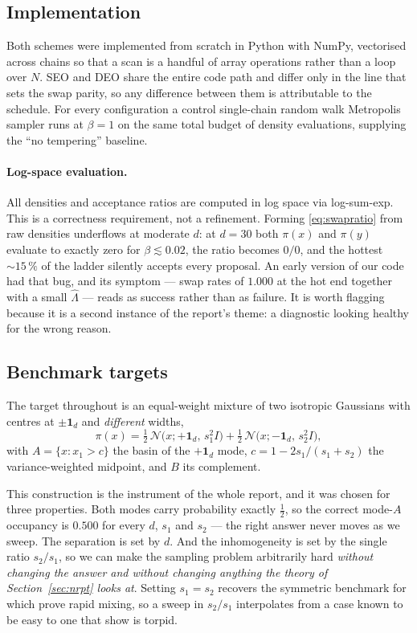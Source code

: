 \subsection{Implementation}

Both schemes were implemented from scratch in Python with NumPy, vectorised
across chains so that a scan is a handful of array operations rather than a loop
over $N$. SEO and DEO share the entire code path and differ only in the line that
sets the swap parity, so any difference between them is attributable to the
schedule. For every configuration a control single-chain random walk Metropolis
sampler runs at $\beta=1$ on the same total budget of density evaluations,
supplying the ``no tempering'' baseline.

\paragraph{Log-space evaluation.}
All densities and acceptance ratios are computed in log space via log-sum-exp.
This is a correctness requirement, not a refinement. Forming \eqref{eq:swapratio}
from raw densities underflows at moderate $d$: at $d=30$ both $\pi(x)$ and
$\pi(y)$ evaluate to exactly zero for $\beta\lesssim0.02$, the ratio becomes
$0/0$, and the hottest $\sim\!15\,\%$ of the ladder silently accepts every
proposal. An early version of our code had that bug, and its symptom --- swap
rates of $1.000$ at the hot end together with a small $\hat\Lambda$ --- reads as
success rather than as failure. It is worth flagging because it is a second
instance of the report's theme: a diagnostic looking healthy for the wrong
reason.

\subsection{Benchmark targets}
\label{sec:benchmark}

The target throughout is an equal-weight mixture of two isotropic Gaussians with
centres at $\pm\mathbf1_d$ and \emph{different} widths,
\begin{equation}
  \pi(x)=\tfrac12\,\mathcal N\!\big(x;+\mathbf1_d,\,s_1^2I\big)
        +\tfrac12\,\mathcal N\!\big(x;-\mathbf1_d,\,s_2^2I\big),
  \label{eq:target}
\end{equation}
with $A=\{x:x_1>c\}$ the basin of the $+\mathbf1_d$ mode, $c=1-2s_1/(s_1+s_2)$
the variance-weighted midpoint, and $B$ its complement.

This construction is the instrument of the whole report, and it was chosen for
three properties. Both modes carry probability exactly $\tfrac12$, so the correct
mode-$A$ occupancy is $0.500$ for every $d$, $s_1$ and $s_2$ --- the right answer
never moves as we sweep. The separation is set by $d$. And the inhomogeneity is
set by the single ratio $s_2/s_1$, so we can make the sampling problem
arbitrarily hard \emph{without changing the answer and without changing anything
the theory of Section~\ref{sec:nrpt} looks at}. Setting $s_1=s_2$ recovers the
symmetric benchmark for which \citet{woodard2009rapid} prove rapid mixing, so a
sweep in $s_2/s_1$ interpolates from a case known to be easy to one that
\citet{woodard2009torpid} show is torpid.

